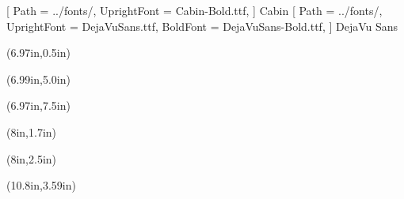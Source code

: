 \documentclass[a4paper,landspace]{article}
\begin{document}
\newfontfamily{\cabinbold}
              [ Path = ../fonts/,
                UprightFont = Cabin-Bold.ttf,
              ]{ Cabin }
\newfontfamily{\dejavusans}
              [ Path = ../fonts/,
                UprightFont = DejaVuSans.ttf,
                BoldFont = DejaVuSans-Bold.ttf,
              ]{ DejaVu Sans }
\pagestyle{empty}
\pagecolor{Blue}

\begin{textblock*}{0in}(6.97in,0.5in) %
  \begin{turn}{-90}
    {\fontsize{16}{16} {}}
  \end{turn}
\end{textblock*}

\begin{textblock*}{0in}(6.99in,5.0in) %
  \begin{turn}{-90}
    {\fontsize{14}{14} {}}
  \end{turn}
\end{textblock*}

\begin{textblock*}{0in}(6.97in,7.5in) %
  \begin{turn}{-90}
    {\fontsize{16}{16} {}}
  \end{turn}
\end{textblock*}

\begin{textblock*}{5in}(8in,1.7in) %
    {\fontsize{50}{50} {}}
\end{textblock*}

\begin{textblock*}{5in}(8in,2.5in) %
    {\fontsize{58}{58} {}}
\end{textblock*}

\begin{textblock*}{5in}(10.8in,3.59in) %
    {\fontsize{36}{36} {}}
\end{textblock*}
\end{document}
